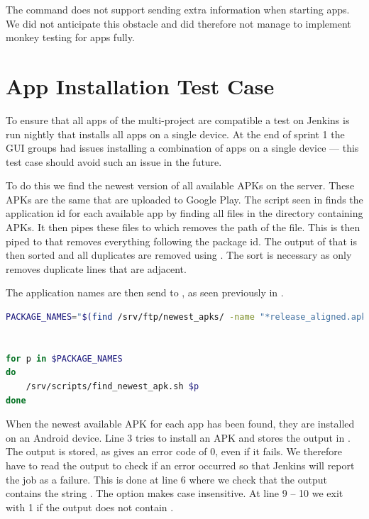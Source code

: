 The  command does not support sending extra information when starting apps. We did not anticipate this obstacle and did therefore not manage to implement monkey testing for apps fully.

\section{App Installation Test Case}
To ensure that all apps of the multi-project are compatible a test on Jenkins is run nightly that installs all apps on a single device. At the end of sprint 1 the GUI groups had issues installing a combination of apps on a single device --- this test case should avoid such an issue in the future.

To do this we find the newest version of all available APKs on the server. These APKs are the same that are uploaded to Google Play. The script seen in  finds the application id for each available app by finding all files in the directory containing APKs. It then pipes these files to  which removes the path of the file. This is then piped to  that removes everything following the package id. The output of that is then sorted and all duplicates are removed using . The sort is necessary as  only removes duplicate lines that are adjacent. 

The application names are then send to , as seen previously in .

\begin{lstlisting}[language=bash,showstringspaces=false,caption=Script that finds the newest available APK for all apps,label=lst:find_all_newest_apks]
PACKAGE_NAMES="$(find /srv/ftp/newest_apks/ -name "*release_aligned.apk" | sed 's|.*/||' | sed 's|_v.*||' | sort | uniq)"


for p in $PACKAGE_NAMES
do
    /srv/scripts/find_newest_apk.sh $p
done
\end{lstlisting}

When the newest available APK for each app has been found, they are installed on an Android device. Line 3 tries to install an APK and stores the output in . The output is stored, as  gives an error code of 0, even if it fails. We therefore have to read the output to check if an error occurred so that Jenkins will report the job as a failure. This is done at line 6 where we check that the output contains the string . The  option makes  case insensitive. At line 9 -- 10 we exit with 1 if the output does not contain .

